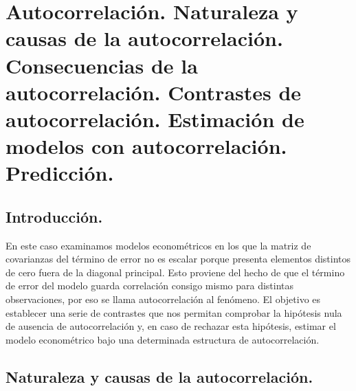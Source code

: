 
\chapter{Autocorrelaci\'on. Naturaleza y causas de la autocorrelaci\'on. Consecuencias
de la autocorrelaci\'on. Contrastes de autocorrelaci\'on. Estimaci\'on de
modelos con autocorrelaci\'on. Predicci\'on.}


\section{Introducci\'on.}

En este caso examinamos modelos econom\'etricos en los que la matriz
de covarianzas del t\'ermino de error no es escalar porque presenta
elementos distintos de cero fuera de la diagonal principal. Esto proviene
del hecho de que el t\'ermino de error del modelo guarda correlaci\'on
consigo mismo para distintas observaciones, por eso se llama autocorrelaci\'on
al fen\'omeno. El objetivo es establecer una serie de contrastes que
nos permitan comprobar la hip\'otesis nula de ausencia de autocorrelaci\'on
y, en caso de rechazar esta hip\'otesis, estimar el modelo econom\'etrico
bajo una determinada estructura de autocorrelaci\'on.


\section{Naturaleza y causas de la autocorrelaci\'on.}

